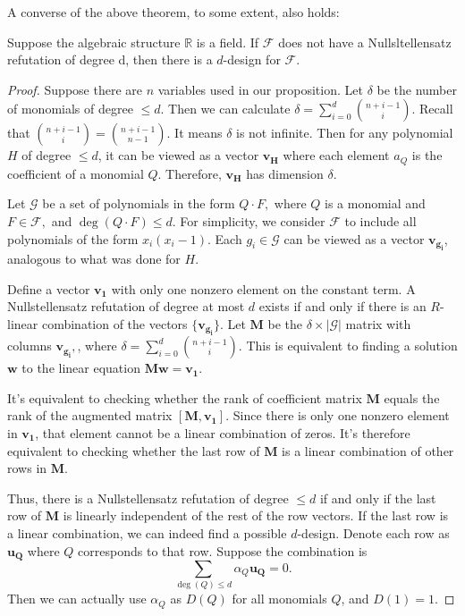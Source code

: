 \documentclass{article}
\begin{document}
A converse of the above theorem, to some extent, also holds:

\begin{Theorem}
  \begin{theorem}
    Suppose the algebraic structure $\mathbb{R}$ is a field. If $\mathcal{F}$ does not have a Nullsltellensatz refutation of degree d, then there is a $d$-design for $\mathcal{F}$.
  \end{theorem}
\end{Theorem}

\begin{Proof}
  \begin{proof}
    Suppose there are $n$ variables used in our proposition. Let $\delta$ be the number of monomials of degree $\leq d$. Then we can calculate $\delta = \sum_{i = 0}^d {{n + i - 1}\choose{i}}$. Recall that ${{n + i - 1} \choose {i}} = {{n + i - 1} \choose {n - 1}}$. It means $\delta$ is not infinite. Then for any polynomial $H$ of degree $\leq d$, it can be viewed as a vector $\mathbf{v_H}$ where each element $a_Q$ is the coefficient of a monomial $Q$. Therefore, $\mathbf{v_H}$ has dimension $\delta$.

Let $\mathcal{G}$ be a set of polynomials in the form $Q \cdot F,$
where $Q$ is a monomial and $F \in \mathcal{F},$ and $\deg(Q \cdot F)
\leq d.$ For simplicity, we consider $\mathcal{F}$ to include all
polynomials of the form $x_i(x_i - 1).$ Each $g_i \in \mathcal{G}$ can
be viewed as a vector $\mathbf{v_{g_i}}$, analogous to what was done
for $H.$

Define a vector $\mathbf{v_1}$ with only one nonzero element on the
constant term. A Nullstellensatz refutation of degree at most $d$
exists if and only if there is an $R$-linear combination of the
vectors $\{\mathbf{v_{g_i}}\}$. Let $\mathbf{M}$ be the $\delta \times
|\mathcal{G}|$ matrix with columns $\mathbf{v_{g_i}},$, where $\delta
= \sum_{i = 0}^d {{n + i - 1}\choose{i}}.$ This is equivalent to
finding a solution $\mathbf{w}$ to the linear equation
$\mathbf{M}\mathbf{w} = \mathbf{v_1}$.

It's equivalent to checking whether the rank of coefficient matrix
$\mathbf{M}$ equals the rank of the augmented matrix $[\mathbf{M},
\mathbf{v_1}]$. Since there is only one nonzero element in
$\mathbf{v_1}$, that element cannot be a linear combination of
zeros. It's therefore equivalent to checking whether the last row of
$\mathbf{M}$ is a linear combination of other rows in $\mathbf{M}$.

Thus, there is a Nullstellensatz refutation of degree $\leq d$ if and
only if the last row of $\mathbf{M}$ is linearly independent of the
rest of the row vectors. If the last row is a linear combination, we
can indeed find a possible $d$-design. Denote each row as
$\mathbf{u_Q}$ where $Q$ corresponds to that row. Suppose the
combination is
\begin{equation}
  \label{eq:linear-comb} \sum_{\deg(Q) \leq d}\alpha_Q\mathbf{u_Q} =
0.
\end{equation} Then we can actually use $\alpha_Q$ as $D(Q)$ for all
monomials $Q$, and $D(1) = 1$.


\end{proof}
\end{Proof}
\end{document}
